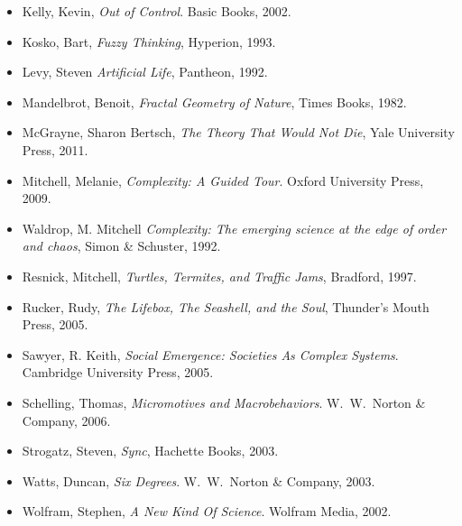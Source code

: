 \documentclass[12pt]{book}
\theoremstyle{exercise}
\newcommand\blankpage{%
    \null
    \thispagestyle{empty}%
    \addtocounter{page}{-1}%
    \newpage}
\begin{document}
\begin{itemize}
\item Kelly, Kevin, {\it  Out of Control}.
Basic Books, 2002.

\item Kosko, Bart, {\it Fuzzy Thinking}, Hyperion, 1993.

\item Levy, Steven {\it  Artificial Life}, Pantheon, 1992.

\item Mandelbrot, Benoit, {\it Fractal Geometry of Nature}, Times Books, 1982.

\item  McGrayne, Sharon Bertsch, {\it The Theory That Would Not Die}, Yale University Press, 2011.

\item Mitchell, Melanie, {\it  Complexity: A Guided Tour}.
Oxford University Press, 2009.

\item Waldrop, M. Mitchell {\it Complexity: The emerging science at the edge of order and chaos},
Simon \& Schuster, 1992.

\item Resnick, Mitchell, {\it  Turtles, Termites, and Traffic Jams},
Bradford, 1997.

\item Rucker, Rudy, {\it  The Lifebox, The Seashell, and the Soul},
Thunder's Mouth Press, 2005.

\item Sawyer, R. Keith, {\it  Social Emergence: Societies As Complex Systems}.
Cambridge University Press, 2005.

\item Schelling, Thomas, {\it  Micromotives and Macrobehaviors}.
W.~W.~Norton \& Company, 2006.

\item Strogatz, Steven, {\it  Sync},
Hachette Books, 2003.

\item Watts, Duncan, {\it  Six Degrees}.
W.~W.~Norton \& Company, 2003.

\item Wolfram, Stephen, {\it  A New Kind Of Science}.
Wolfram Media, 2002.

\end{itemize}



\backmatter
\printindex

\afterpage{\blankpage}
\end{document}
